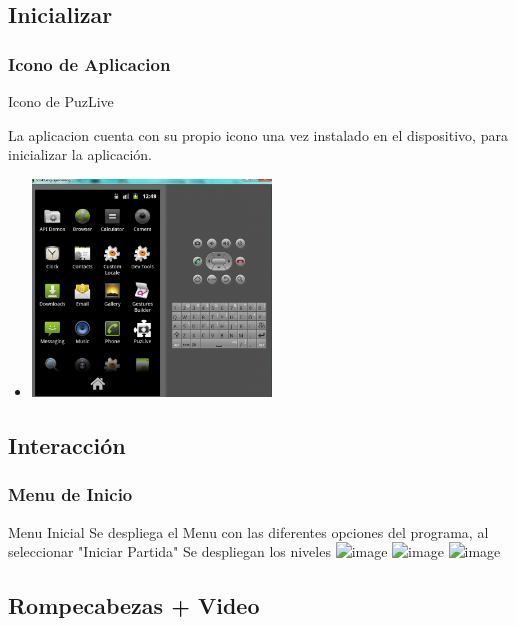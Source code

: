 \documentclass[serif,11pt]{beamer}
\begin{document}
		\subsection{Inicializar}


		\begin{frame}
			\frametitle{Icono de Aplicacion}

			\begin{block}{Icono de PuzLive}

				La aplicacion cuenta con su propio icono una vez instalado en el dispositivo, para inicializar la aplicaci\'on.
					\begin{itemize}
						 \pause
						\item  
						\includegraphics[width=0.5\textwidth]{outmenu} 
						\bigskip
					\end{itemize}

				\end{block}
		\end{frame}




		\subsection{Interacci\'on}
		\begin{frame}
			\frametitle{Menu de Inicio}
				\begin{block}{Menu Inicial}
				Se despliega el Menu con las diferentes opciones del programa, al seleccionar "Iniciar Partida" Se despliegan los niveles
				\includegraphics<1>[height=5cm]{menu1} 
				\includegraphics<2>[height=5cm]{menu2} 
				\includegraphics<3>[height=5cm]{acercade} 
				\end{block}
		\end{frame}



		\subsection{Rompecabezas + Video}
\end{document}
